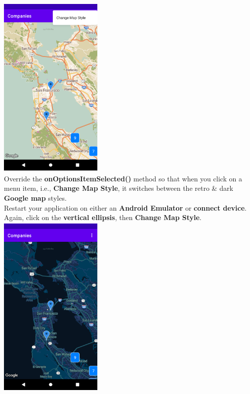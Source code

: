 \documentclass{article}
\begin{document}
\includegraphics[width=5cm, height=9cm]{../tex/img/practicals/05-companies-4.png}  \\

Override the \textbf{onOptionsItemSelected()} method so that when you click on a menu item, i.e., \textbf{Change Map Style}, it switches between the retro \& dark \textbf{Google map} styles. \\

Restart your application on either an \textbf{Android Emulator} or \textbf{connect device}. Again, click on the \textbf{vertical ellipsis}, then \textbf{Change Map Style}. \\ 

\includegraphics[width=5cm, height=9cm]{../tex/img/practicals/05-companies-5.png} 
\end{document}
